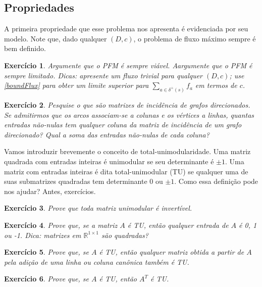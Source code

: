\documentclass[]{article}
\newtheorem{exercicio}{Exercício}
\numberwithin{equation}{section}
\begin{document}
\subsection{Propriedades}

A primeira propriedade que esse problema nos apresenta é evidenciada por seu modelo.
Note que, dado qualquer $(D, c)$, o problema de fluxo máximo sempre é bem definido.

\begin{exercicio}
  Argumente que o PFM é sempre viável. Aargumente que o PFM é sempre limitado.
  Dicas: apresente um fluxo trivial para qualquer $(D, c)$; use \eqref{boundFlux} para
  obter um limite superior para $\sum_{a \in \delta^+(s)} f_a$ em termos de $c$.
\end{exercicio}

\begin{exercicio}
  Pesquise o que são matrizes de incidência de grafos direcionados.
  Se admitirmos que os arcos associam-se a colunas e os vértices a linhas, quantas entradas não-nulas
  tem qualquer coluna da matriz de incidência de um grafo direcionado?
  Qual a soma das entradas não-nulas de cada coluna?
\end{exercicio}

Vamos introduzir brevemente o conceito de total-unimodularidade.
Uma matriz quadrada com entradas inteiras é unimodular se seu determinante é $\pm 1$.
Uma matriz com entradas inteiras é dita total-unimodular (TU) se qualquer uma de suas submatrizes
quadradas tem determinante $0$ ou $\pm 1$.
Como essa definição pode nos ajudar?
Antes, exercícios.

\begin{exercicio}
  Prove que toda matriz unimodular é invertível.
\end{exercicio}

\begin{exercicio}
  Prove que, se a matriz $A$ é TU, então qualquer entrada de $A$ é 0, 1 ou -1.
  Dica: matrizes em $\mathbb{R}^{1 \times 1}$ são quadradas?
\end{exercicio}

\begin{exercicio}
  Prove que, se $A$ é TU, então qualquer matriz obtida a partir de $A$ pela adição de uma linha ou
  coluna canônica também é TU.
\end{exercicio}

\begin{exercicio}
  Prove que, se $A$ é TU, então $A^T$ é TU.
\end{exercicio}
\end{document}
